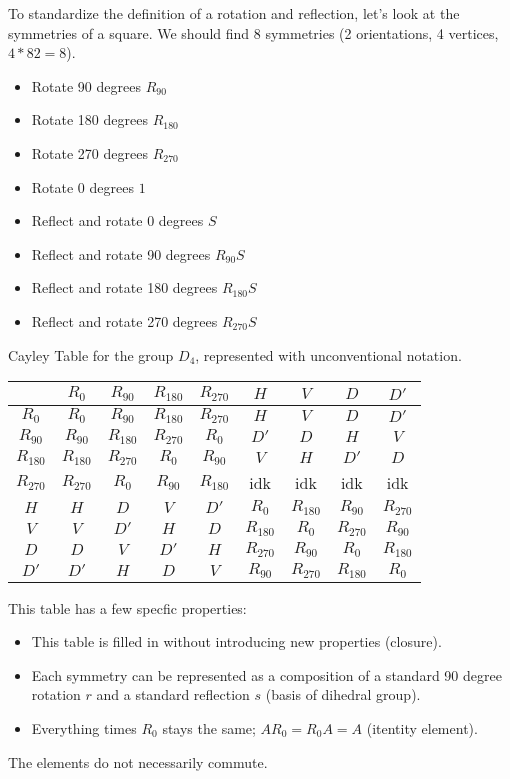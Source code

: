 To standardize the definition of a rotation and reflection, let's look at the symmetries of a square. We should find 8 symmetries (2 orientations, 4 vertices, $4*82=8$).
\begin{itemize}
	\item Rotate 90 degrees $R_{90}$
	\item Rotate 180 degrees $R_{180}$
	\item Rotate 270 degrees $R_{270}$
	\item Rotate 0 degrees $1$
	\item Reflect and rotate 0 degrees $S$
	\item Reflect and rotate 90 degrees $R_{90}S$
	\item Reflect and rotate 180 degrees $R_{180}S$
	\item Reflect and rotate 270 degrees $R_{270}S$
\end{itemize}
\begin{center}
	Cayley Table for the group $D_4$, represented with unconventional notation.\\
\begin{tabular}{c|cccccccc}
	&$R_0$ &$R_{90}$&$R_{180}$ &$R_{270}$&$H$ &$V$ &$D$ & $D'$ \\
	\hline
	$R_0$ &$R_0$ &$R_{90}$&$R_{180}$ &$R_{270}$ &$H$&$V$ &$D$ &$D'$ \\
	$R_{90}$ &$R_{90}$ & $R_{180}$ &$R_{270}$ &$R_0$ &$D'$ &$D$ &$H$ &$V$ \\
	$R_{180}$ &$R_{180}$ &$R_{270}$ &$R_0$ &$R_{90}$ &$V$ &$H$ &$D'$ &$D$ \\
	$R_{270}$ &$R_{270}$ &$R_{0}$ &$R_{90}$ &$R_{180}$ &idk&idk&idk&idk\\
	$H$ &$H$ &$D$ &$V$ &$D'$& $R_0$ &$R_{180}$&$R_{90}$ &$R_{270}$\\
	$V$ &$V$ &$D'$ &$H$ &$D$ &$R_{180}$ &$R_0$ &$R_{270}$ &$R_{90}$\\
	$D$ &$D$ &$V$ &$D'$&$H$ &$R_{270}$ &$R_{90}$ &$R_0$ &$R_{180}$ \\
	$D'$ &$D'$ &$H$ &$D$ &$V$ &$R_{90}$ &$R_{270}$ &$R_{180}$ &$R_0$
\end{tabular}
\end{center}

This table has a few specfic properties:
\begin{itemize}
	\item This table is filled in without introducing new properties (closure).
	\item Each symmetry can be represented as a composition of a standard 90 degree rotation $r$ and a standard reflection $s$ (basis of dihedral group).
	\item Everything times $R_0$ stays the same; $AR_0=R_0A=A$ (itentity element).
\end{itemize}
\begin{remark}
	The elements do not necessarily commute.
\end{remark}
